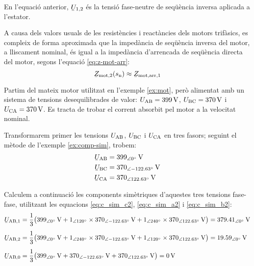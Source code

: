 En l'equació anterior, $\cmplx{U}_{1,2}$ és la tensió  fase-neutre de seqüència inversa aplicada a l’estator.

A causa dels valors usuals de les resistències i reactàncies dels motors trifàsics, es compleix de forma aproximada que la impedància de seqüència inversa del motor, a lliscament nominal,  és igual a la impedància d'arrencada de seqüència directa del motor, segons l'equació \eqref{eq:z-mot-arr}:
\begin{equation}
	\cmplx{Z}\ped{mot,2}(s\ped{n}) \approx \cmplx{Z}\ped{mot,arr,1}\label{eq:Zarr-aprox-Z2}
\end{equation}


\begin{exemple}\label{ex:mot-tens-deseq}
	Partim del mateix motor utilitzat en l'exemple \vref{ex:mot}, però alimentat amb un sistema de tensions desequilibrades de valor: $U_\mathrm{AB} =
	\qty{399}{V}$, $U_\mathrm{BC} = \qty{370}{V}$ i
	$U_\mathrm{CA} = \qty{370}{V}$. Es tracta de trobar el corrent absorbit pel motor a la velocitat nominal.
	
	Transformarem primer les tensions $U_\mathrm{AB}$, $U_\mathrm{BC}$ i $U_\mathrm{CA}$ en tres fasors; seguint el mètode de l'exemple \vref{ex:comp-sim}, trobem:
	\begin{align*}
		\cmplx{U}\ped{AB} &= \qtypd{399}{0}{V} \\
		\cmplx{U}\ped{BC} &= \qtypd{370}{-122,63}{V} \\
		\cmplx{U}\ped{CA} &= \qtypd{370}{122,63}{V}
	\end{align*}
	
	Calculem a continuació les components simètriques d'aquestes tres tensions fase-fase, utilitzant les equacions
	\eqref{eq:c_sim_c2}, \eqref{eq:c_sim_a2} i \eqref{eq:c_sim_b2}:
	\begin{align*}
	\cmplx{U}\ped{AB,1} &= \frac{1}{3} \big(
	\qtypd{399}{0}{V} + \numpd{1}{120} \times \qtypd{370}{-122,63}{V} +
	\numpd{1}{240} \times \qtypd{370}{122,63}{V}\big) = \qtypd{379,41}{0}{V} \\[1ex]
	\cmplx{U}\ped{AB,2} &= \frac{1}{3} \big(
	\qtypd{399}{0}{V} + \numpd{1}{240} \times \qtypd{370}{-122,63}{V} +
	\numpd{1}{120} \times \qtypd{370}{122,63}{V} \big) = \qtypd{19,59}{0}{V} \\[1ex]
	\cmplx{U}\ped{AB,0} &= \frac{1}{3} \big(
	\qtypd{399}{0}{V} + \qtypd{370}{-122,63}{V} + \qtypd{370}{122,63}{V}\big) = \qty{0}{V}
	\end{align*}
	

\end{exemple}
